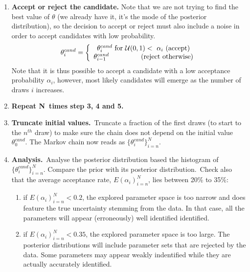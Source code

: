 \documentclass[a4paper,12pt]{article}%
\begin{document}
\begin{enumerate}
\item \textbf{Accept or reject the candidate.} Note that we are not trying to
find the best value of $\theta$ (we already have it, it's the mode of the
posterior distribution), so the decision to accept or reject must also include
a noise in order to accept candidates with low probability.%
\[
\theta_{i}^{cand}=\left\{
\begin{array}
[c]{c}%
\theta_{i}^{cand}\text{ for }\mathcal{U}(0,1)<\text{ }\alpha_{i}\text{
(accept)}\\
\theta_{i-1}^{cand}\text{ \ \ \ \ \ \ \ \ \ \ \ \ \ (reject otherwise)}%
\end{array}
\right.
\]
Note that it is thus possible to accept a candidate with a low acceptance
probability $\alpha_{i}$, however, most likely candidates will emerge as the
number of draws $i$ increases.

\item \textbf{Repeat N\ times step 3, 4 and 5.}

\item \textbf{Truncate initial values.}\ Truncate a fraction of the first
draws (to start to the $n^{th}$ draw) to make sure the chain does not depend
on the initial value $\theta_{0}^{cand}$. The Markov chain now reads as
$\{\theta_{i}^{cand}\}_{i=n}^{N}$.

\item \textbf{Analysis.}\ Analyse the posterior distribution based the
histogram of $\{\theta_{i}^{cand}\}_{i=n}^{N}$. Compare the prior with its
posterior distribution.\ Check also that the average acceptance rate,
$E(\alpha_{i})_{i=n}^{N}$, lies between 20\% to 35\%:

\begin{enumerate}
\item if $E(\alpha_{i})_{i=n}^{N}<0.2$, the explored parameter space is too
narrow and does feature the true uncertainty stemming from the data. In that
case, all the parameters will appear (erroneously) well identified identified.

\item if $E(\alpha_{i})_{i=n}^{N}<0.35$, the explored parameter space is too
large. The posterior distributions will include parameter sets that are
rejected by the data. Some parameters may appear weakly indentified while they
are actually accurately identified.
\end{enumerate}
\end{enumerate}

%

%
\end{document}
